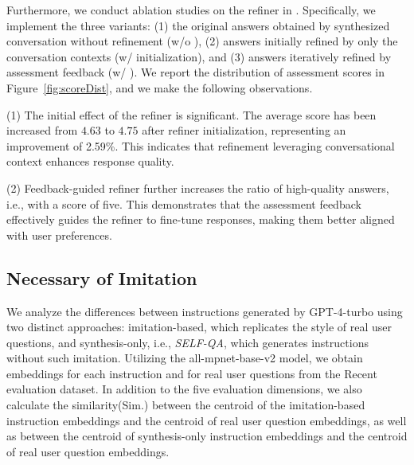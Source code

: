 Furthermore, we conduct ablation studies on the refiner in \convrefinefull. Specifically, we implement the three variants: (1) the original answers obtained by synthesized conversation without refinement (w/o \convrefine), (2) answers initially refined by only the conversation contexts (w/ \convrefine initialization), and (3) answers iteratively refined by assessment feedback (w/ \convrefine). We report the distribution of assessment scores in Figure~\ref{fig:scoreDist}, and we make the following observations.

(1) The initial effect of the refiner is significant. The average score has been increased from $4.63$ to $4.75$ after refiner initialization, representing an improvement of 2.59\%. This indicates that refinement leveraging conversational context enhances response quality.

(2) Feedback-guided refiner further increases the ratio of high-quality answers, i.e., with a score of five. This demonstrates that the assessment feedback effectively guides the refiner to fine-tune responses, making them better aligned with user preferences.



\begin{table}[!t]
\caption{Performance of Imitation-based and Synthesis-only seed data}
\label{tab:imqVsSynQ}
\end{table}
\subsection{Necessary of Imitation}
We analyze the differences between instructions generated by GPT-4-turbo using two distinct approaches: imitation-based, which replicates the style of real user questions, and synthesis-only, i.e., \textit{SELF-QA}, which generates instructions without such imitation. Utilizing the all-mpnet-base-v2 model, we obtain embeddings for each instruction and for real user questions from the Recent evaluation dataset. In addition to the five evaluation dimensions, we also calculate the similarity(Sim.) between the centroid of the imitation-based instruction embeddings and the centroid of real user question embeddings, as well as between the centroid of synthesis-only instruction embeddings and the centroid of real user question embeddings.

